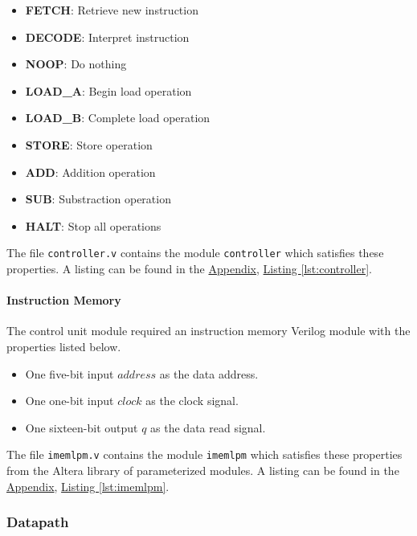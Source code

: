 \begin{itemize}
\begin{itemize}
        \item \textbf{FETCH}: Retrieve new instruction
        \item \textbf{DECODE}: Interpret instruction
        \item \textbf{NOOP}: Do nothing
        \item \textbf{LOAD\_A}: Begin load operation
        \item \textbf{LOAD\_B}: Complete load operation
        \item \textbf{STORE}: Store operation
        \item \textbf{ADD}: Addition operation
        \item \textbf{SUB}: Substraction operation
        \item \textbf{HALT}: Stop all operations
    \end{itemize}
\end{itemize}

The file \verb|controller.v| contains the module \verb|controller| which satisfies these properties.
A listing can be found in the \hyperref[sec:appendix]{Appendix}, \hyperref[lst:controller]{Listing \ref*{lst:controller}}.

\paragraph{Instruction Memory} \label{par:imem}

The control unit module required an instruction memory Verilog module with the properties listed below.

\begin{itemize}
    \item One five-bit input $address$ as the data address.
    \item One one-bit input $clock$ as the clock signal.
    \item One sixteen-bit output $q$ as the data read signal.
\end{itemize}

The file \verb|imemlpm.v| contains the module \verb|imemlpm| which satisfies these properties from the Altera library of parameterized modules.
A listing can be found in the \hyperref[sec:appendix]{Appendix}, \hyperref[lst:imemlpm]{Listing \ref*{lst:imemlpm}}.

\subsubsection{Datapath} \label{subsub:datapath}

